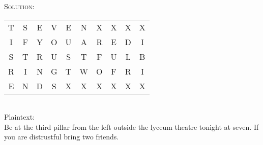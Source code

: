 \documentclass[12pt]{article}
\newenvironment{solution}
    {\textsc{Solution:}\\}
    {\newpage}%
\begin{document}
\begin{solution}
\begin{center}
\begin{tabular}{|c|c|c|c|c|c|c|c|c|c|}
				T & S & E  & V & E & N & X & X & X & X \\
				I & F & Y  & O & U & A & R & E & D & I \\
				S & T & R  & U & S & T & F & U & L & B \\
				R & I & N  & G & T & W & O & F & R & I \\
				E & N & D  & S & X & X & X & X & X & X \\ \hline
			\end{tabular}
			\\
			\vspace{10mm}
			Plaintext:\\
			Be at the third pillar from the left outside the lyceum theatre
			tonight at seven. If you are distrustful bring two friends.
		\end{center}
	\end{solution}
\end{document}
